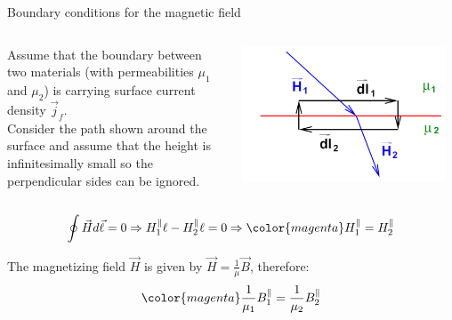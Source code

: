 \begin{frame}{Boundary conditions for the magnetic field}

\begin{columns}
  \begin{column}{0.50\textwidth}
   {\small
     Assume that the boundary between two materials (with
     permeabilities $\mu_1$ and  $\mu_2$)
     is carrying surface current density $\vec{j}_f$.\\
     Consider the path shown around the surface and
     assume that the height is infinitesimally small so the perpendicular
     sides can be ignored.
  }
  \end{column}
  \begin{column}{0.50\textwidth}
    \begin{center}
      \includegraphics[width=0.95\textwidth]{./images/schematics/boundary_conditions_magnetic_field_2.png}\\
    \end{center}
  \end{column}
\end{columns}

\begin{equation*}
  \oint \vec{H} d\vec{\ell} = 0 \Rightarrow
       H_1^{\parallel} \ell - H_2^{\parallel} \ell = 0 \Rightarrow
        {\color{magenta} H_1^{\parallel} = H_2^{\parallel}}
\end{equation*}

The magnetizing field $\vec{H}$ is given by
$\displaystyle \vec{H} = \frac{1}{\mu} \vec{B}$,
therefore:
\begin{equation*}
        {\color{magenta} \frac{1}{\mu_1}  B_1^{\parallel} = \frac{1}{\mu_2} B_2^{\parallel}}
\end{equation*}

\end{frame}


